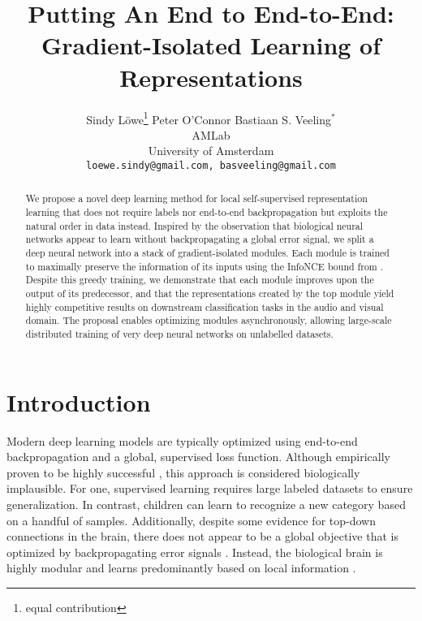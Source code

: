 \documentclass{article}
\title{Putting An End to End-to-End: \\ Gradient-Isolated Learning of Representations}
\author{
    Sindy L\"owe\thanks{equal contribution} \hspace*{2em}Peter O'Connor  \hspace*{2em}Bastiaan S. Veeling$^*$ \\
    AMLab \\
    University of Amsterdam\\
    \texttt{loewe.sindy@gmail.com, basveeling@gmail.com}\\
}
\begin{document}
\maketitle






\begin{abstract}
We propose a novel deep learning method for local self-supervised representation learning that does not require labels nor end-to-end backpropagation but exploits the natural order in data instead. Inspired by the observation that biological neural networks appear to learn without backpropagating a global error signal, we split a deep neural network into a stack of gradient-isolated modules. Each module is trained to maximally preserve the information of its inputs using the InfoNCE bound from \citet{oord2018representation}. Despite this greedy training, we demonstrate that each module improves upon the output of its predecessor, and that the representations created by the top module yield highly competitive results on downstream classification tasks in the audio and visual domain. The proposal enables optimizing modules asynchronously, allowing large-scale distributed training of very deep neural networks on unlabelled datasets. 




\end{abstract}



\section{Introduction}

Modern deep learning models are typically optimized using end-to-end backpropagation and a global, supervised loss function. Although empirically proven to be highly successful \citep{krizhevsky2012imagenet,szegedy2015going}, 
this approach is considered biologically implausible. For one, supervised learning requires large labeled datasets to ensure generalization. In contrast, children can learn to recognize a new category based on a handful of samples. Additionally, despite some evidence for top-down connections in the brain, there does not appear to be a global objective that is optimized by backpropagating error signals \citep{crick1989recent,marblestone2016toward}. Instead, the biological brain is highly modular and learns predominantly based on local information \citep{caporale2008spike}.
\end{document}
